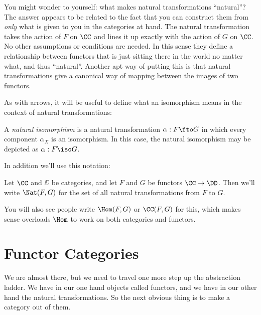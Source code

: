 You might wonder to yourself: what makes natural transformations ``natural''? The answer
appears to be related to the fact that you can construct them from {\it only} what is
given to you in the categories at hand. The natural transformation takes the action of $F$
on $\CC$ and lines it up exactly with the action of $G$ on $\CC$. No other assumptions or
conditions are needed. In this sense they define a relationship between functors that is
just sitting there in the world no matter what, and thus ``natural''. Another apt way of
putting this is that natural transformations give a canonical way of mapping between the
images of two functors.

As with arrows, it will be useful to define what an isomorphism means in the context of
natural transformations:

\begin{defn}
A {\it natural isomorphism} is a natural transformation $\alpha: F \fto G$ in which every
component $\alpha_X$ is an isomorphism. In this case, the natural isomorphism may be
depicted as $\alpha: F \iso G$.
\end{defn}

In addition we'll use this notation:

\begin{defn}
Let $\CC$ and $\DD$ be categories, and let $F$ and $G$ be functors $\CC \to \DD$. Then we'll write $\Nat(F, G)$ 
for the set of all natural transformations from $F$ to $G$.
\end{defn}
\noindent
You will also see people write $\Hom(F, G)$ or $\CC(F, G)$ for this, which makes sense overloads $\Hom$
to work on both categories and functors.

\section{Functor Categories}

We are almost there, but we need to travel one more step up the abstraction ladder. We
have in our one hand objects called functors, and we have in our other hand the natural
transformations. So the next obvious thing is to make a category out of them.

